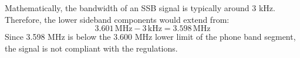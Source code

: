 Mathematically, the bandwidth of an SSB signal is typically around 3 kHz. Therefore, the lower sideband components would extend from:
\[ 3.601 \, \text{MHz} - 3 \, \text{kHz} = 3.598 \, \text{MHz} \]
Since 3.598 MHz is below the 3.600 MHz lower limit of the phone band segment, the signal is not compliant with the regulations.

